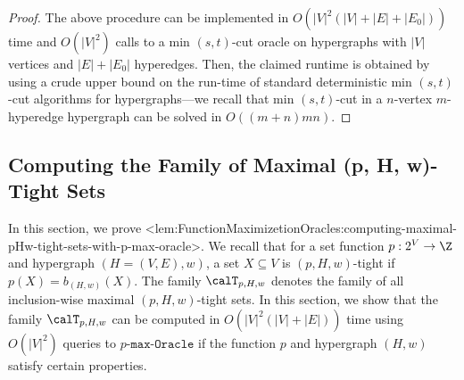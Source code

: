 \documentclass{article}
\def\Cref#1{<#1>}%
\def\({}
\def\){}
\newcommand{\functionMaximizationEmptyOracle}[1]
{\ensuremath{{#1}\text{-}\mathtt{max}\text{-}\mathtt{Oracle}}\xspace}
\newcommand{\maximalTightSetFamily}[1]{\ensuremath{\calT_{#1}}\xspace}
\begin{document}
\begin{proof}
    The above procedure can be implemented in $O(|V|^2(|V| + |E| + |E_0|))$ time and $O(|V|^2)$ calls to a min $(s,t)$-cut oracle on hypergraphs with $|V|$ vertices and $|E| + |E_0|$ hyperedges. Then, the claimed runtime is obtained by using a crude upper bound on the run-time of standard deterministic min $(s,t)$-cut algorithms for hypergraphs---we recall that min $(s,t)$-cut in a $n$-vertex $m$-hyperedge hypergraph can be solved in $O((m+n)mn)$.
\end{proof}


\subsection{Computing the Family of Maximal \((p, H, w)\)-Tight Sets}\label{appendix:sec:Function-Maximization-Oracles:computing-maximal-pHw-tight-sets-family}
In this section, we prove \Cref{lem:FunctionMaximizetionOracles:computing-maximal-pHw-tight-sets-with-p-max-oracle}. 
We recall that for a set function $p:2^V\rightarrow\Z$ and hypergraph $(H = (V, E), w)$, a set $X\subseteq V$ is $(p, H, w)$-tight if $p(X) = b_{(H,w)}(X)$. The family $\maximalTightSetFamily{p, H, w}$ denotes the family of all inclusion-wise maximal $(p, H, w)$-tight sets. In this section, we show that the family $\maximalTightSetFamily{p, H, w}$ can be computed in $O(|V|^2(|V| + |E|))$ time using $O(|V|^2)$ queries to \functionMaximizationEmptyOracle{p} if the function $p$ and hypergraph $(H, w)$ satisfy certain properties.
\end{document}
